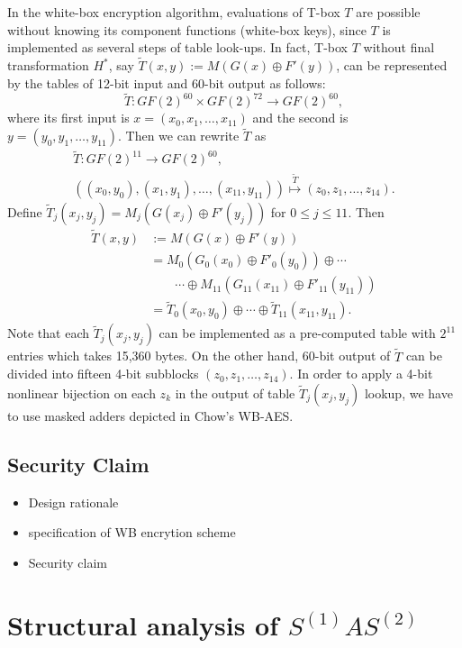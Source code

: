 \documentclass{ieeeaccess}
\begin{document}
In the white-box encryption algorithm,
evaluations of T-box $T$ are possible without knowing its component functions (white-box keys),
since $T$ is implemented as several steps of table look-ups.
In fact, T-box $T$ without final transformation $H^*$, 
say $\tilde T(x,y):= M(G(x)\oplus F'(y))$, can be represented
by the tables of 12-bit input and 60-bit output as follows:
\[
\tilde T: GF(2)^{60} \times GF(2)^{72} \to GF(2)^{60}, 
\]
where its first input is $x = (x_0, x_1, \ldots, x_{11})$  
and the second is $y = (y_0, y_1, \ldots , y_{11})$.
Then we can rewrite $\tilde T$ as  
\begin{gather*}
\tilde T: GF(2)^{11} \to GF(2)^{60},\\
\left( (x_0, y_0), (x_1, y_1), \ldots, (x_{11}, y_{11}) \right)
\stackrel{\tilde T}{\mapsto} (z_0, z_1, \ldots, z_{14}).
\end{gather*}
Define $\tilde T_j(x_j, y_j) = M_j( G(x_j) \oplus F'(y_j))$ for
$0\le j \le 11$.
Then 
\begin{align*}
\tilde T(x,y) & := M(G(x)\oplus F'(y)) \\
&= M_0(G_0(x_0)\oplus F'_0(y_0)) \oplus \cdots \\
& \quad\quad \cdots\oplus M_{11}(G_{11}(x_{11}) \oplus F'_{11}(y_{11})) \\
&= \tilde T_0(x_0, y_0) \oplus \cdots \oplus \tilde T_{11}(x_{11}, y_{11}).
\end{align*}
Note that each $\tilde T_j(x_j, y_j)$ can be implemented
as a pre-computed table with $2^{11}$ entries which takes 15,360 bytes.
On the other hand, 60-bit output of $\tilde T$ can be divided into 
fifteen 4-bit subblocks $(z_0, z_1, \ldots, z_{14})$.
In order to apply a 4-bit nonlinear bijection on each $z_k$ 
in the output of table $\tilde T_j(x_j, y_j)$ lookup,
we have to use masked adders depicted in Chow's WB-AES.


\subsection{Security Claim}

\begin{itemize}
\item Design rationale
\item specification of WB encrytion scheme
\item Security claim
\end{itemize}


\section{Structural analysis of $S^{(1)}AS^{(2)}$}
\end{document}
